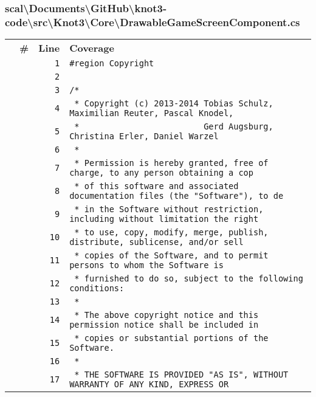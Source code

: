 \documentclass[a4paper,10pt]{article}
\begin{document}
\subsubsection{scal\textbackslash Documents\textbackslash GitHub\textbackslash knot3-code\textbackslash src\textbackslash Knot3\textbackslash Core\textbackslash DrawableGameScreenComponent.cs}
\begin{longtable}[l]{lrrl}
\textbf{} & \textbf{\#} & \textbf{Line} & \textbf{Coverage}\\
\cellcolor{gray} &  & \verb~1~ & \verb~#region Copyright~\\
\cellcolor{gray} &  & \verb~2~ & \verb~~\\
\cellcolor{gray} &  & \verb~3~ & \verb~/*~\\
\cellcolor{gray} &  & \verb~4~ & \verb~ * Copyright (c) 2013-2014 Tobias Schulz, Maximilian Reuter, Pascal Knodel,~\\
\cellcolor{gray} &  & \verb~5~ & \verb~ *                         Gerd Augsburg, Christina Erler, Daniel Warzel~\\
\cellcolor{gray} &  & \verb~6~ & \verb~ *~\\
\cellcolor{gray} &  & \verb~7~ & \verb~ * Permission is hereby granted, free of charge, to any person obtaining a cop~\\
\cellcolor{gray} &  & \verb~8~ & \verb~ * of this software and associated documentation files (the "Software"), to de~\\
\cellcolor{gray} &  & \verb~9~ & \verb~ * in the Software without restriction, including without limitation the right~\\
\cellcolor{gray} &  & \verb~10~ & \verb~ * to use, copy, modify, merge, publish, distribute, sublicense, and/or sell~\\
\cellcolor{gray} &  & \verb~11~ & \verb~ * copies of the Software, and to permit persons to whom the Software is~\\
\cellcolor{gray} &  & \verb~12~ & \verb~ * furnished to do so, subject to the following conditions:~\\
\cellcolor{gray} &  & \verb~13~ & \verb~ *~\\
\cellcolor{gray} &  & \verb~14~ & \verb~ * The above copyright notice and this permission notice shall be included in ~\\
\cellcolor{gray} &  & \verb~15~ & \verb~ * copies or substantial portions of the Software.~\\
\cellcolor{gray} &  & \verb~16~ & \verb~ *~\\
\cellcolor{gray} &  & \verb~17~ & \verb~ * THE SOFTWARE IS PROVIDED "AS IS", WITHOUT WARRANTY OF ANY KIND, EXPRESS OR~\\

\end{longtable}
\end{document}
